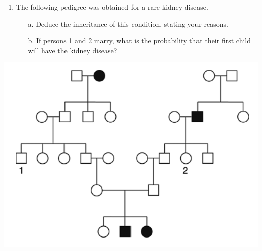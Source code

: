 \documentclass[11pt,]{article}
\providecommand{\tightlist}{%
  \setlength{\itemsep}{0pt}\setlength{\parskip}{0pt}}
\begin{document}
\begin{blackbox}

\begin{enumerate}
\def\labelenumi{\arabic{enumi}.}
\setcounter{enumi}{52}
\tightlist
\item
  The following pedigree was obtained for a rare kidney disease.

  \begin{enumerate} 
   \item[a.]{ Deduce the inheritance of this condition, stating your reasons. } 
   \item[b.]{ If persons 1 and 2 marry, what is the probability that their first child will have the kidney disease? } 
   \end{enumerate}
\end{enumerate}

\hfill\break

\begin{center}\includegraphics[width=0.55\linewidth,]{input/53pedigree} \end{center}

\vspace{12cm}

\end{blackbox}
\end{document}
